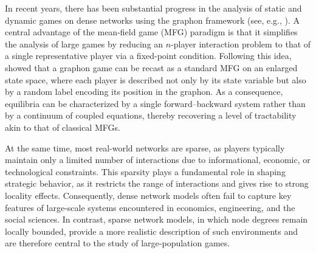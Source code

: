 \documentclass[11pt]{article}
\numberwithin{equation}{section}
\begin{document}
In recent years, there has been substantial progress in the analysis of static and dynamic games on dense networks using the graphon framework (see, e.g., \cite{aurell2022stochastic,caines2019graphon,caines2021graphon,carmona2022stochastic, neuman2024stochastic,neuman2025stochastic, parise2021analysis, parise2023graphon, tangpi2024optimal}). A central advantage of the mean-field game (MFG) paradigm is that it simplifies the analysis of large games by reducing an $n$-player interaction problem to that of a single representative player via a fixed-point condition. Following this idea, \citet{lacker2023label} showed that a graphon game can be recast as a standard MFG on an enlarged state space, where each player is described not only by its state variable but also by a random label encoding its position in the graphon. As a consequence, equilibria can be characterized by a single forward–backward system rather than by a continuum of coupled equations, thereby recovering a level of tractability akin to that of classical MFGs.

At the same time, most real-world networks are sparse, as players typically maintain only a limited number of interactions due to informational, economic, or technological constraints. This sparsity plays a fundamental role in shaping strategic behavior, as it restricts the range of interactions and gives rise to strong locality effects. Consequently, dense network models often fail to capture key features of large-scale systems encountered in economics, engineering, and the social sciences. In contrast, sparse network models, in which node degrees remain locally bounded, provide a more realistic description of such environments and are therefore central to the study of large-population games.
\end{document}
